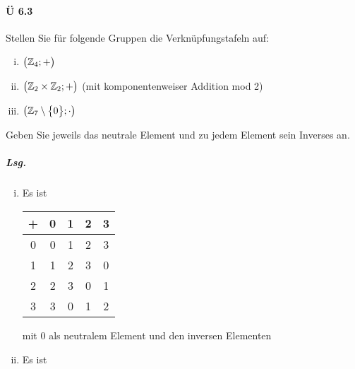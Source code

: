 \documentclass{scrreprt}
\begin{document}
\paragraph{Ü 6.3} Stellen Sie für folgende Gruppen die Verknüpfungstafeln auf:
\begin{enumerate}[(i)]
\item $\qty\big(\mathbb{Z}_4; +)$
\item $\qty\big(\mathbb{Z}_2 \times \mathbb{Z}_2; +)$
  (mit komponentenweiser Addition mod 2)
\item $\qty\big(\mathbb{Z}_7 \setminus \qty\big{0}; \cdot)$
\end{enumerate}
Geben Sie jeweils das neutrale Element und zu jedem Element sein Inverses an.

\subparagraph{Lsg.}
\begin{enumerate}[(i)]
\item Es ist

  \begin{tabular}{|c|cccc|}
    \hline
    + & 0 & 1 & 2 & 3 \\
    \hline
    0 & 0 & 1 & 2 & 3 \\
    1 & 1 & 2 & 3 & 0 \\
    2 & 2 & 3 & 0 & 1 \\
    3 & 3 & 0 & 1 & 2 \\
    \hline
  \end{tabular}

  mit $0$ als neutralem Element und den inversen Elementen


\item Es ist


\end{enumerate}
\end{document}
